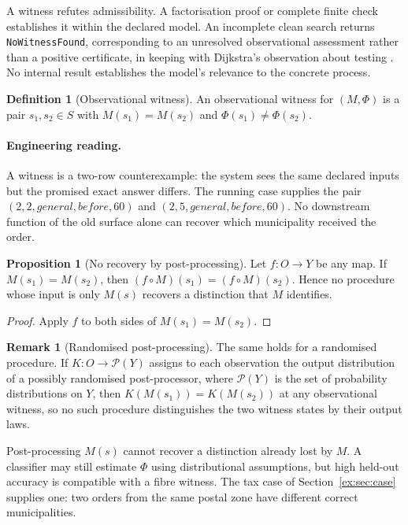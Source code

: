 \documentclass[11pt]{article}
\theoremstyle{definition}
\newtheorem{definition}{Definition}[section]
\newtheorem{proposition}{Proposition}[section]
\newtheorem{remark}{Remark}[section]
\newcommand{\code}[1]{\texttt{#1}}
\begin{document}
A witness refutes admissibility. A factorisation proof or complete finite check establishes it within the declared model. An incomplete clean search returns \code{NoWitnessFound}, corresponding to an unresolved observational assessment rather than a positive certificate, in keeping with Dijkstra's observation about testing \citep{dijkstra1970}. No internal result establishes the model's relevance to the concrete process.

\begin{definition}[Observational witness]\label{ex:def:witness}
An observational witness for $(M,\Phi)$ is a pair $s_1,s_2 \in S$ with $M(s_1)=M(s_2)$ and $\Phi(s_1) \neq \Phi(s_2)$.
\end{definition}

\paragraph{Engineering reading.} A witness is a two-row counterexample: the system sees the same declared inputs but the promised exact answer differs. The running case supplies the pair $(2,2,\mathit{general},\mathit{before},60)$ and $(2,5,\mathit{general},\mathit{before},60)$. No downstream function of the old surface alone can recover which municipality received the order.

\begin{proposition}[No recovery by post-processing]\label{ex:prop:norecovery}
Let $f:O\to Y$ be any map. If $M(s_1)=M(s_2)$, then $(f \circ M)(s_1)=(f \circ M)(s_2)$. Hence no procedure whose input is only $M(s)$ recovers a distinction that $M$ identifies.
\end{proposition}

\begin{proof}
Apply $f$ to both sides of $M(s_1)=M(s_2)$.
\end{proof}

\begin{remark}[Randomised post-processing]\label{ex:cor:no-stochastic-recovery}
The same holds for a randomised procedure. If $K:O\to\mathcal{P}(Y)$ assigns to each observation the output distribution of a possibly randomised post-processor, where $\mathcal{P}(Y)$ is the set of probability distributions on $Y$, then $K(M(s_1))=K(M(s_2))$ at any observational witness, so no such procedure distinguishes the two witness states by their output laws.
\end{remark}

Post-processing $M(s)$ cannot recover a distinction already lost by $M$. A classifier may still estimate $\Phi$ using distributional assumptions, but high held-out accuracy is compatible with a fibre witness. The tax case of Section~\ref{ex:sec:case} supplies one: two orders from the same postal zone have different correct municipalities.
\end{document}
